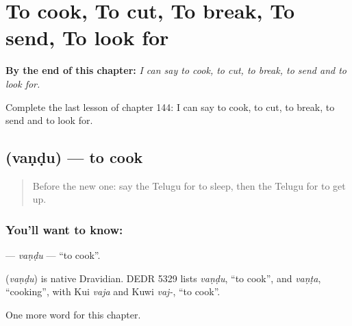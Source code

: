 
\chapter{To cook, To cut, To break, To send, To look for}
\label{ch:te-to-cook-to-cut-to-break-to-send-to-look-for}

\begin{chapteropening}
\textbf{By the end of this chapter:} \emph{I can say to cook, to cut, to break, to send and to look for.}

Complete the last lesson of chapter 144: I can say to cook, to cut, to break, to send and to look for.
\end{chapteropening}

\section[\texorpdfstring{\te{వండు} (vaṇḍu)}{వండు (vaṇḍu)}]{ (vaṇḍu) — to cook}

\label{lesson:TE-C144-vandu}



\begin{quote}
Before the new one: say the Telugu for to sleep, then the Telugu for to get up.
\end{quote}

\subsection*{You'll want to know: }
\textbf{} — \emph{vaṇḍu} — \textquotedblleft{}to cook\textquotedblright{}.

\begin{cousinweb}
\textbf{} (\emph{vaṇḍu}) is native Dravidian. DEDR 5329 lists \emph{vaṇḍu}, \textquotedblleft{}to cook\textquotedblright{}, and \emph{vaṇṭa}, \textquotedblleft{}cooking\textquotedblright{}, with Kui \emph{vaja} and Kuwi \emph{vaj-}, \textquotedblleft{}to cook\textquotedblright{}.
\end{cousinweb}

\begin{grammarlens}[title={What you've built}]
One more word for this chapter.
\end{grammarlens}


